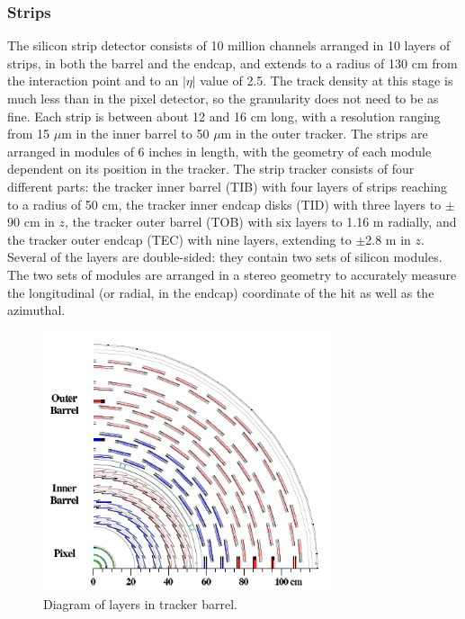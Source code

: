 \subsubsection{Strips}
\label{exp:strips}
The silicon strip detector consists of 10 million channels
arranged in 10 layers of strips, 
in both the barrel and the endcap,
and extends to a radius of 130 cm from the interaction point
and to an $|\eta|$ value of 2.5.  
The track density at this stage is much less than in the pixel detector,
so the granularity does not need to be as fine.
Each strip is between about 12 and 16 cm long,
with a resolution ranging from 
15 $\mu$m in the inner barrel
to %
50 $\mu$m in the outer tracker.  
The strips are arranged in modules of 6 inches in length, 
with the geometry of each module dependent 
on its position in the tracker.  
The strip tracker consists of four different parts: 
the tracker inner barrel (TIB) with four layers of strips reaching to a radius of 50 cm, 
the tracker inner endcap disks (TID) with three layers to $\pm$90 cm in $z$, 
the tracker outer barrel (TOB) with six layers to 1.16 m radially, 
and the tracker outer endcap (TEC) with nine layers, extending to $\pm$2.8 m in $z$. 
Several of the layers are double-sided: 
they contain two sets of silicon modules.  
The two sets of modules are arranged in a stereo
geometry to accurately measure the longitudinal
(or radial, in the endcap) coordinate of the hit 
as well as the azimuthal.  


 \begin{figure}[htb]
  \begin{center}
    \includegraphics[width=240pt]{Figures/tracker-schematic.png}
  \end{center}
  \caption[\fixspacing Diagram of layers in tracker barrel]
	  {\fixspacing Diagram of layers in tracker barrel.}
  \label{fig:TrackerBarrel}
 \end{figure}

